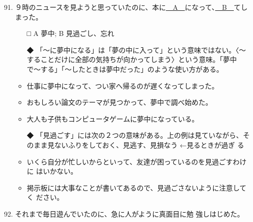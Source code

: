 \documentclass[
uplatex,
b5paper,
10pt,
dvipdfmx
]{jsbook}
\begin{document}
\begin{enumerate}
\setcounter{enumi}{90}

\item ９時のニュースを見ようと思っていたのに、本に\underline{　A　}になって、\underline{　B　}てしまった。

\begin{itemize}
\item[□] A 夢中; B 見過ごし、忘れ
\item[◆] 「〜に夢中になる」は「夢の中に入って」という意味ではない。〈〜
	  することだけに全部の気持ちが向かってしまう〉という意味。「夢中
	  で〜する」「〜したときは夢中だった」のような使い方がある。
\end{itemize}
\begin{itemize}
\item 仕事に夢中になって、つい家へ帰るのが遅くなってしまった。
\item おもしろい論文のテーマが見つかって、夢中で調べ始めた。
\item 大人も子供もコンピュータゲームに夢中になっている。
\end{itemize}
\begin{itemize}
\item[◆] 「見過ごす」には次の２つの意味がある。上の例は見ていながら、そ
	  のまま見ないふりをしておく、見逃す、見損なう ←見るときが過ぎ
	  る
\end{itemize}
\begin{itemize}
\item いくら自分が忙しいからといって、友達が困っているのを見過ごすわけに
      はいかない。
\item 掲示板には大事なことが書いてあるので、見過ごさないように注意してく
      ださい。
\end{itemize}


\item それまで毎日遊んでいたのに、急に人が\underline{\hspace{3zw}}ように真面目に勉
      強しはじめた。


\end{enumerate}
\end{document}
